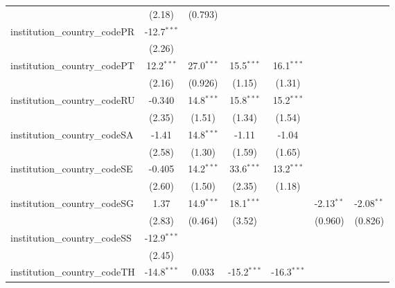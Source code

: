 \begin{tabular}{lcccccc}
                                         & (2.18)        & (0.793)       &               &               &               &   \\   
   institution\_country\_codePR          & -12.7$^{***}$ &               &               &               &               &   \\   
                                         & (2.26)        &               &               &               &               &   \\   
   institution\_country\_codePT          & 12.2$^{***}$  & 27.0$^{***}$  & 15.5$^{***}$  & 16.1$^{***}$  &               &   \\   
                                         & (2.16)        & (0.926)       & (1.15)        & (1.31)        &               &   \\   
   institution\_country\_codeRU          & -0.340        & 14.8$^{***}$  & 15.8$^{***}$  & 15.2$^{***}$  &               &   \\   
                                         & (2.35)        & (1.51)        & (1.34)        & (1.54)        &               &   \\   
   institution\_country\_codeSA          & -1.41         & 14.8$^{***}$  & -1.11         & -1.04         &               &   \\   
                                         & (2.58)        & (1.30)        & (1.59)        & (1.65)        &               &   \\   
   institution\_country\_codeSE          & -0.405        & 14.2$^{***}$  & 33.6$^{***}$  & 13.2$^{***}$  &               &   \\   
                                         & (2.60)        & (1.50)        & (2.35)        & (1.18)        &               &   \\   
   institution\_country\_codeSG          & 1.37          & 14.9$^{***}$  & 18.1$^{***}$  &               & -2.13$^{**}$  & -2.08$^{**}$\\   
                                         & (2.83)        & (0.464)       & (3.52)        &               & (0.960)       & (0.826)\\   
   institution\_country\_codeSS          & -12.9$^{***}$ &               &               &               &               &   \\   
                                         & (2.45)        &               &               &               &               &   \\   
   institution\_country\_codeTH          & -14.8$^{***}$ & 0.033         & -15.2$^{***}$ & -16.3$^{***}$ &               &   \\   

\end{tabular}
